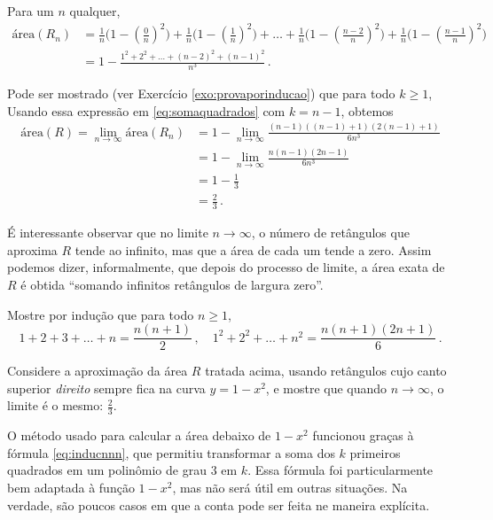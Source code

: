 Para um $n$ qualquer,
\begin{align}
\text{área}(R_n)&=\tfrac1n\big(1-(\tfrac{0}{n})^2)
+\tfrac1n\big(1-(\tfrac{1}{n})^2)+\dots
+\tfrac1n\big(1-(\tfrac{n-2}{n})^2)
+\tfrac1n\big(1-(\tfrac{n-1}{n})^2)\nonumber\\
&=1-\tfrac{1^2+2^2+\dots+(n-2)^2+(n-1)^2}{n^3}\,.\label{eq:somaquadrados}
\end{align}

Pode ser mostrado (ver Exercício \ref{exo:provaporinducao}) que para todo
$k\geq 1$,
Usando essa expressão em \eqref{eq:somaquadrados} com $k=n-1$, obtemos
\begin{align*}
\text{área}(R)=\lim_{n\to \infty}\text{área}(R_n)&=1-\lim_{n\to \infty}
\frac{(n-1)((n-1)+1)(2(n-1)+1)}{6n^3}\\
&=1-\lim_{n\to \infty}
\frac{n(n-1)(2n-1)}{6n^3}\\
&=1-\tfrac{1}{3}\\
&=\tfrac{2}{3}\,.
\end{align*}

\begin{obs}
É interessante observar que no limite $n\to\infty$, o número de retângulos que
aproxima $R$ tende ao infinito,
mas que a área de cada um tende a zero. Assim podemos dizer, informalmente, que
depois do processo de limite, a área exata de $R$
é obtida ``somando infinitos retângulos de largura zero''.
\end{obs}


\begin{exo}\label{exo:provaporinducao}
Mostre por indução que para todo $n\geq 1$, 
$$1+2+3+\dots+n=\frac{n(n+1)}{2}\,,\quad
1^2+2^2+\dots+n^2=\frac{n(n+1)(2n+1)}{6}\,.$$
\end{exo}

\begin{exo}
Considere a aproximação da área $R$ tratada acima, usando retângulos cujo canto
superior \emph{direito} sempre fica na curva $y=1-x^2$, e mostre que quando 
$n\to\infty$, o limite é o mesmo: $\tfrac23$.
\end{exo}


O método usado para calcular a área debaixo de $1-x^2$ 
funcionou graças à fórmula \eqref{eq:inducnnn}, que
permitiu transformar a soma dos $k$ primeiros quadrados em um
polinômio de grau $3$ em $k$. Essa fórmula foi particularmente bem adaptada à
função $1-x^2$, mas não será útil em outras situações. 
Na verdade, são poucos casos em que a conta pode ser feita ne maneira
explícita.

